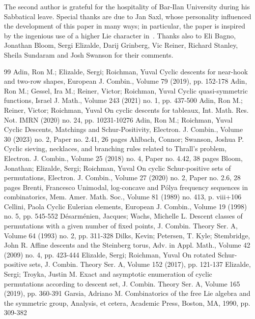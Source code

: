 \documentclass[10pt]{article}
\theoremstyle{definition}
\providecommand{\longthanks}[1]{\par\smallskip\noindent #1\par\smallskip}
\begin{document}
\longthanks{The second author is grateful for the hospitality of Bar-Ilan University during his Sabbatical leave.
Special thanks are due to Jan Saxl, whose personality influenced the development of this paper in many ways; in particular, the paper is inspired by the  
ingenious use of a higher Lie character in~\cite{Saxletal}.
Thanks also 
to Eli Bagno, Jonathan Bloom, Sergi Elizalde, Darij Grinberg, 
Vic Reiner, Richard Stanley, Sheila Sundaram and Josh Swanson for their comments.
}


\begin{thebibliography}{99}
Adin, Ron M.; Elizalde, Sergi; Roichman, Yuval Cyclic descents for near-hook and two-row shapes, European J. Combin., Volume 79 (2019), pp. 152-178
Adin, Ron M.; Gessel, Ira M.; Reiner, Victor; Roichman, Yuval Cyclic quasi-symmetric functions, Israel J. Math., Volume 243 (2021) no. 1, pp. 437-500
Adin, Ron M.; Reiner, Victor; Roichman, Yuval On cyclic descents for tableaux, Int. Math. Res. Not. IMRN (2020) no. 24, pp. 10231-10276
Adin, Ron M.; Roichman, Yuval Cyclic Descents, Matchings and Schur-Positivity, Electron. J. Combin., Volume 30 (2023) no. 2, Paper no. 2.41, 26 pages
Ahlbach, Connor; Swanson, Joshua P. Cyclic sieving, necklaces, and branching rules related to Thrall’s problem, Electron. J. Combin., Volume 25 (2018) no. 4, Paper no. 4.42, 38 pages
Bloom, Jonathan; Elizalde, Sergi; Roichman, Yuval On cyclic Schur-positive sets of permutations, Electron. J. Combin., Volume 27 (2020) no. 2, Paper no. 2.6, 28 pages
Brenti, Francesco Unimodal, log-concave and Pólya frequency sequences in combinatorics, Mem. Amer. Math. Soc., Volume 81 (1989) no. 413, p. viii+106
Cellini, Paola Cyclic Eulerian elements, European J. Combin., Volume 19 (1998) no. 5, pp. 545-552
Désarménien, Jacques; Wachs, Michelle L. Descent classes of permutations with a given number of fixed points, J. Combin. Theory Ser. A, Volume 64 (1993) no. 2, pp. 311-328
Dilks, Kevin; Petersen, T. Kyle; Stembridge, John R. Affine descents and the Steinberg torus, Adv. in Appl. Math., Volume 42 (2009) no. 4, pp. 423-444
Elizalde, Sergi; Roichman, Yuval On rotated Schur-positive sets, J. Combin. Theory Ser. A, Volume 152 (2017), pp. 121-137
Elizalde, Sergi; Troyka, Justin M. Exact and asymptotic enumeration of cyclic permutations according to descent set, J. Combin. Theory Ser. A, Volume 165 (2019), pp. 360-391
Garsia, Adriano M. Combinatorics of the free Lie algebra and the symmetric group, Analysis, et cetera, Academic Press, Boston, MA, 1990, pp. 309-382

\end{thebibliography}
\end{document}
